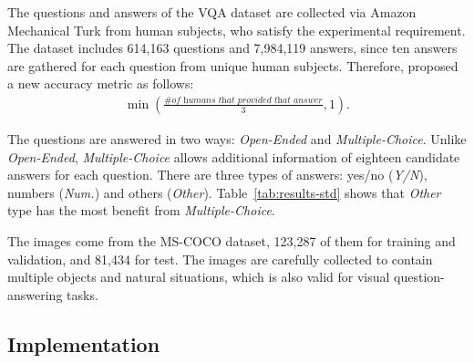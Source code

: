 \documentclass{article}
\begin{document}
The questions and answers of the VQA dataset are collected via Amazon Mechanical Turk from human subjects, who satisfy the experimental requirement. The dataset includes 614,163 questions and 7,984,119 answers, since ten answers are gathered for each question from unique human subjects. Therefore, \citet{Antol2015} proposed a new accuracy metric as follows: \begin{align}
   \min\left( \frac{\textit{\# of humans that provided that answer}}{3}, 1 \right).
\end{align} 

The questions are answered in two ways: \textit{Open-Ended} and \textit{Multiple-Choice}. Unlike \textit{Open-Ended}, \textit{Multiple-Choice} allows additional information of eighteen candidate answers for each question. There are three types of answers: yes/no (\textit{Y/N}), numbers (\textit{Num.}) and others (\textit{Other}). Table~\ref{tab:results-std} shows that \textit{Other} type has the most benefit from \textit{Multiple-Choice}.

The images come from the MS-COCO dataset, 123,287 of them for training and validation, and 81,434 for test. The images are carefully collected to contain multiple objects and natural situations, which is also valid for visual question-answering tasks.

\subsection{Implementation}
\end{document}
